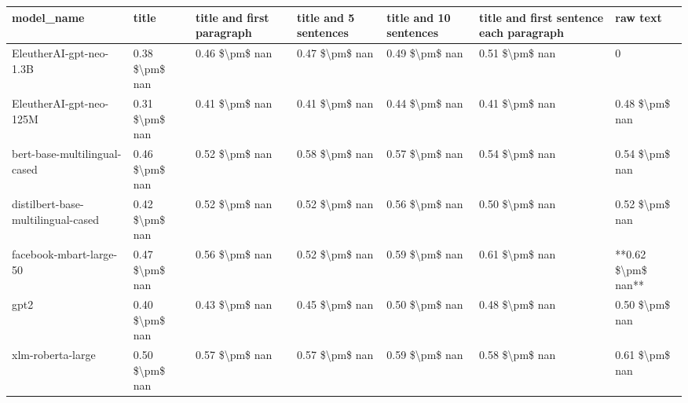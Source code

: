 \begin{tabular}{lllllll}
\toprule
                        model\_name &          title & title and first paragraph & title and 5 sentences & title and 10 sentences & title and first sentence each paragraph &           raw text \\
\midrule
           EleutherAI-gpt-neo-1.3B & 0.38 \$\textbackslash pm\$ nan &            0.46 \$\textbackslash pm\$ nan &        0.47 \$\textbackslash pm\$ nan &         0.49 \$\textbackslash pm\$ nan &                          0.51 \$\textbackslash pm\$ nan &                  0 \\
           EleutherAI-gpt-neo-125M & 0.31 \$\textbackslash pm\$ nan &            0.41 \$\textbackslash pm\$ nan &        0.41 \$\textbackslash pm\$ nan &         0.44 \$\textbackslash pm\$ nan &                          0.41 \$\textbackslash pm\$ nan &     0.48 \$\textbackslash pm\$ nan \\
      bert-base-multilingual-cased & 0.46 \$\textbackslash pm\$ nan &            0.52 \$\textbackslash pm\$ nan &        0.58 \$\textbackslash pm\$ nan &         0.57 \$\textbackslash pm\$ nan &                          0.54 \$\textbackslash pm\$ nan &     0.54 \$\textbackslash pm\$ nan \\
distilbert-base-multilingual-cased & 0.42 \$\textbackslash pm\$ nan &            0.52 \$\textbackslash pm\$ nan &        0.52 \$\textbackslash pm\$ nan &         0.56 \$\textbackslash pm\$ nan &                          0.50 \$\textbackslash pm\$ nan &     0.52 \$\textbackslash pm\$ nan \\
           facebook-mbart-large-50 & 0.47 \$\textbackslash pm\$ nan &            0.56 \$\textbackslash pm\$ nan &        0.52 \$\textbackslash pm\$ nan &         0.59 \$\textbackslash pm\$ nan &                          0.61 \$\textbackslash pm\$ nan & **0.62 \$\textbackslash pm\$ nan** \\
                              gpt2 & 0.40 \$\textbackslash pm\$ nan &            0.43 \$\textbackslash pm\$ nan &        0.45 \$\textbackslash pm\$ nan &         0.50 \$\textbackslash pm\$ nan &                          0.48 \$\textbackslash pm\$ nan &     0.50 \$\textbackslash pm\$ nan \\
                 xlm-roberta-large & 0.50 \$\textbackslash pm\$ nan &            0.57 \$\textbackslash pm\$ nan &        0.57 \$\textbackslash pm\$ nan &         0.59 \$\textbackslash pm\$ nan &                          0.58 \$\textbackslash pm\$ nan &     0.61 \$\textbackslash pm\$ nan \\
\bottomrule
\end{tabular}
